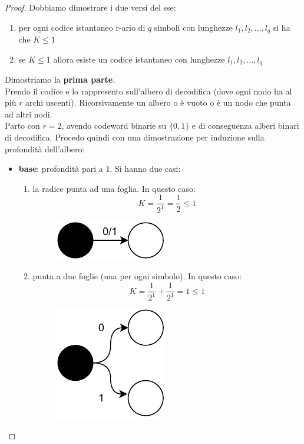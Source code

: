 \documentclass[a4paper,12pt, oneside]{book}
\begin{document}
\begin{proof}
  Dobbiamo dimostrare i due versi del sse:
  \begin{enumerate}
    \item per ogni codice istantaneo r-ario di $q$ simboli con lunghezze
    $l_1,l_2,\ldots,l_q$ si ha che $K\leq 1$
    \item se $K\leq 1$ allora esiste un codice istantaneo con lunghezze
    $l_1,l_2,\ldots,l_q$ 
  \end{enumerate}
  Dimostriamo la \textbf{prima parte}.\\
  Prendo il codice e lo rappresento sull'albero di decodifica (dove ogni nodo ha
  al più $r$ archi uscenti). Ricorsivamente un albero o è vuoto o è un nodo che
  punta ad altri nodi.\\
  Parto con $r=2$, avendo codeword binarie su $\{0,1\}$ e di conseguenza alberi
  binari di decodifica. Procedo quindi con una dimostrazione per induzione sulla
  profondità dell'albero:
  \begin{itemize}
    \item \textbf{base}: profondità pari a 1. Si hanno due casi:
    \begin{enumerate}
      \item la radice punta ad una foglia. In questo caso:
      \[K=\frac{1}{2^1}=\frac{1}{2}\leq 1\]
      \begin{figure}[H]
        \centering
        \includegraphics[scale = 0.7]{img/ct6.pdf}
      \end{figure}
      \item punta a due foglie (una per ogni simbolo). In questo caso:
      \[K=\frac{1}{2^1}+\frac{1}{2^1}=1\leq 1\]
      \begin{figure}[H]
        \centering
        \includegraphics[scale = 0.7]{img/ct5.pdf}
      \end{figure}
    \end{enumerate}
    

\end{itemize}
\end{proof}
\end{document}
